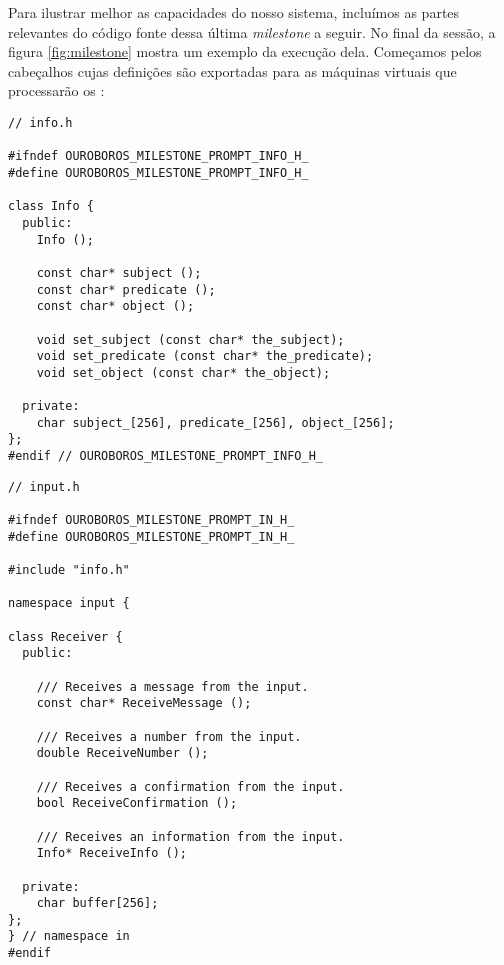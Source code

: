 Para ilustrar melhor as capacidades do nosso sistema, incluímos as
partes relevantes do código fonte dessa última \textit{milestone}
a seguir. No final da sessão, a figura \ref{fig:milestone} mostra
um exemplo da execução dela. Começamos pelos cabeçalhos cujas
definições são exportadas para as máquinas virtuais que processarão os :

\vspace{1em}
\begin{lstlisting}
// info.h

#ifndef OUROBOROS_MILESTONE_PROMPT_INFO_H_
#define OUROBOROS_MILESTONE_PROMPT_INFO_H_

class Info {
  public:
    Info ();

    const char* subject ();
    const char* predicate ();
    const char* object ();

    void set_subject (const char* the_subject);
    void set_predicate (const char* the_predicate);
    void set_object (const char* the_object);

  private:
    char subject_[256], predicate_[256], object_[256];
};
#endif // OUROBOROS_MILESTONE_PROMPT_INFO_H_
\end{lstlisting}
\vspace{1em}
\begin{lstlisting}
// input.h  

#ifndef OUROBOROS_MILESTONE_PROMPT_IN_H_
#define OUROBOROS_MILESTONE_PROMPT_IN_H_

#include "info.h"

namespace input {

class Receiver {
  public:

    /// Receives a message from the input.
    const char* ReceiveMessage ();
    
    /// Receives a number from the input.
    double ReceiveNumber ();
    
    /// Receives a confirmation from the input.
    bool ReceiveConfirmation ();

    /// Receives an information from the input.
    Info* ReceiveInfo ();

  private:
    char buffer[256];
};
} // namespace in
#endif
\end{lstlisting}

